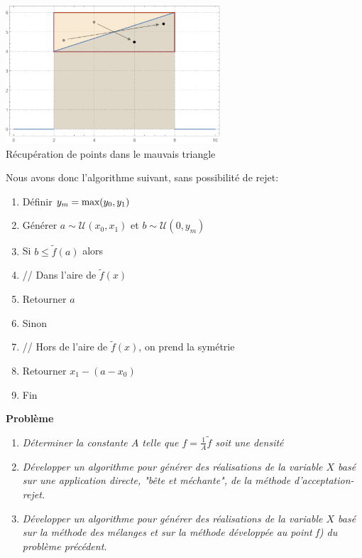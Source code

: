 \documentclass[a4paper,11pt]{report}
\newcounter{numero}
\newcommand{\exo}{
	{\large
		\vspace{5mm}
		\addtocounter{numero}{1}
		{\bf Problème~\thenumero}
		\vspace{2mm}
	}
}
\newcommand{\tab}{\hspace{1em}}
\begin{document}
\begin{enumerate}[\indent a)]
\begin{center}
	\includegraphics[width=8cm]{img_graph4}\\
	{\footnotesize Récupération de points dans le mauvais triangle}
\end{center}

Nous avons donc l'algorithme suivant, sans possibilité de rejet:
\begin{enumerate}[1]
	\ttfamily
	\item Définir $y_m = \textnormal{max}(y_0, y_1)$
	\item Générer $a \sim \mathcal{U}(x_0,x_1)$ et $b \sim \mathcal{U}(0,y_m)$
	\item Si $b \leq \tilde{f}(a)$ alors
	\item \tab // Dans l'aire de $\tilde{f}(x)$
	\item \tab Retourner $a$
	\item Sinon
	\item \tab // Hors de l'aire de $\tilde{f}(x)$, on prend la symétrie
	\item \tab Retourner $x_1 - (a - x_0)$
	\item Fin
\end{enumerate}

\end{enumerate}

\exo
\begin{enumerate}[\indent a)]\itemsep3mm
	
\item {\em Déterminer la constante $A$ telle que $f=\frac{1}{A}\tilde{f}$ soit une densité}

\item {\em Développer un algorithme pour générer des réalisations de la variable $X$ basé sur une application directe, "bête et méchante", de la méthode d'acceptation-rejet.}

\item {\em Développer un algorithme pour générer des réalisations de la variable $X$ basé sur la méthode des mélanges et sur la méthode développée au point f) du problème précédent.}

\end{enumerate}
\end{document}
